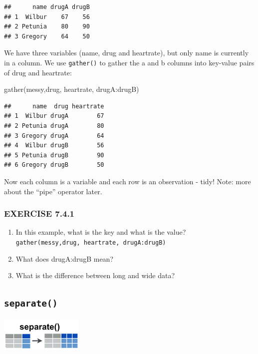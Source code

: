 \documentclass[
]{book}
\newenvironment{Shaded}{\begin{snugshade}}{\end{snugshade}}
\newcommand{\FunctionTok}[1]{\textcolor[rgb]{0.00,0.00,0.00}{#1}}
\newcommand{\NormalTok}[1]{#1}
\newcommand{\SpecialCharTok}[1]{\textcolor[rgb]{0.00,0.00,0.00}{#1}}
\begin{document}
\begin{verbatim}
##      name drugA drugB
## 1  Wilbur    67    56
## 2 Petunia    80    90
## 3 Gregory    64    50
\end{verbatim}

We have three variables (name, drug and heartrate), but only name is currently in a column. We use \texttt{gather()} to gather the a and b columns into key-value pairs of drug and heartrate:

\begin{Shaded}
\begin{Highlighting}[]
  \FunctionTok{gather}\NormalTok{(messy,drug, heartrate, drugA}\SpecialCharTok{:}\NormalTok{drugB)}
\end{Highlighting}
\end{Shaded}

\begin{verbatim}
##      name  drug heartrate
## 1  Wilbur drugA        67
## 2 Petunia drugA        80
## 3 Gregory drugA        64
## 4  Wilbur drugB        56
## 5 Petunia drugB        90
## 6 Gregory drugB        50
\end{verbatim}

Now each column is a variable and each row is an observation - tidy! Note: more about the ``pipe'' operator later.

\hypertarget{exercise-7.4.1}{%
\subsubsection*{EXERCISE 7.4.1}\label{exercise-7.4.1}}

\begin{enumerate}
\def\labelenumi{\arabic{enumi}.}
\item
  In this example, what is the key and what is the value?
  \texttt{gather(messy,drug,\ heartrate,\ drugA:drugB)}
\item
  What does drugA:drugB mean?
\item
  What is the difference between long and wide data?
\end{enumerate}

\hypertarget{separate}{%
\subsection*{\texorpdfstring{\texttt{separate()}}{separate()}}\label{separate}}

\includegraphics{./figures/tidyr-separate.png}
\end{document}

